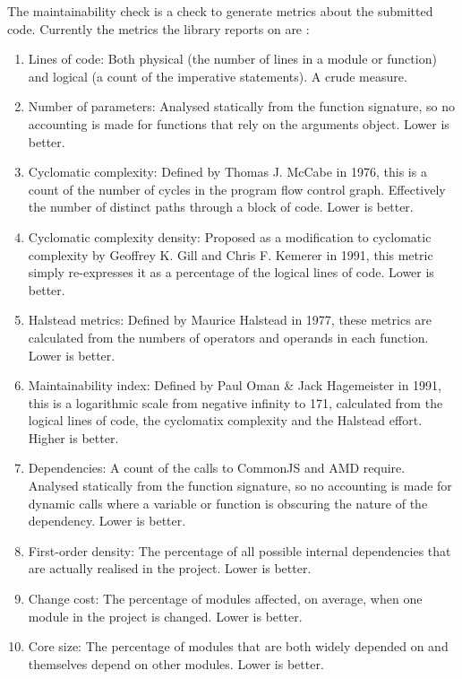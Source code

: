 The maintainability check is a check to generate metrics about the submitted code.
Currently the metrics the library reports on are :
\begin{enumerate}
 \item Lines of code: Both physical (the number of lines in a module or function) and logical (a count of the imperative statements). A crude measure.
 \item Number of parameters: Analysed statically from the function signature, so no accounting is made for functions that rely on the arguments object. Lower is better.
 \item Cyclomatic complexity: Defined by Thomas J. McCabe in 1976, this is a count of the number of cycles in the program flow control graph. Effectively the number of distinct paths through a block of code. Lower is better.
 \item Cyclomatic complexity density: Proposed as a modification to cyclomatic complexity by Geoffrey K. Gill and Chris F. Kemerer in 1991, this metric simply re-expresses it as a percentage of the logical lines of code. Lower is better.
 \item Halstead metrics: Defined by Maurice Halstead in 1977, these metrics are calculated from the numbers of operators and operands in each function. Lower is better.
 \item Maintainability index: Defined by Paul Oman \& Jack Hagemeister in 1991, this is a logarithmic scale from negative infinity to 171, calculated from the logical lines of code, the cyclomatix complexity and the Halstead effort. Higher is better.
 \item Dependencies: A count of the calls to CommonJS and AMD require. Analysed statically from the function signature, so no accounting is made for dynamic calls where a variable or function is obscuring the nature of the dependency. Lower is better.
 \item First-order density: The percentage of all possible internal dependencies that are actually realised in the project. Lower is better.
 \item Change cost: The percentage of modules affected, on average, when one module in the project is changed. Lower is better.
 \item Core size: The percentage of modules that are both widely depended on and themselves depend on other modules. Lower is better.
\end{enumerate}

